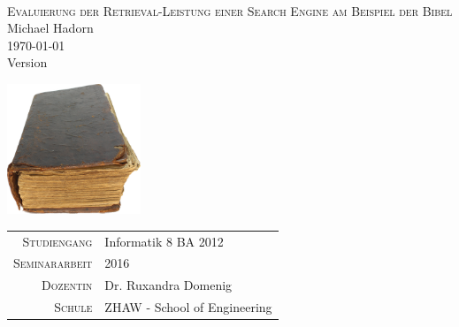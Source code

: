 




\begin{titlepage}
	\mbox{}\vspace{5\baselineskip}\\
	\rmfamily\huge
	\centering
	\textsc{Evaluierung der Retrieval-Leistung einer Search Engine am Beispiel der Bibel} \\
	
	\vspace{2em}
	Michael Hadorn\\
	\vspace{\baselineskip}
	\rmfamily\Large
	\today\\
	Version \mbox{} \\
	\normalsize
	
	\vspace{6em}
	\includegraphics[width=0.3\textwidth]{images/0-title/bible.png}
	
	\vfill

	\begin{center}
		\begin{tabular}[h]{ r l }
			\textsc{\small{Studiengang}} & Informatik 8 BA 2012\\
			\textsc{\small{Seminararbeit}} & 2016\\
			\textsc{\small{Dozentin}} & Dr. Ruxandra Domenig\\
			\textsc{\small{Schule}} & ZHAW - School of Engineering\\
		\end{tabular}
	\end{center}

\end{titlepage}


